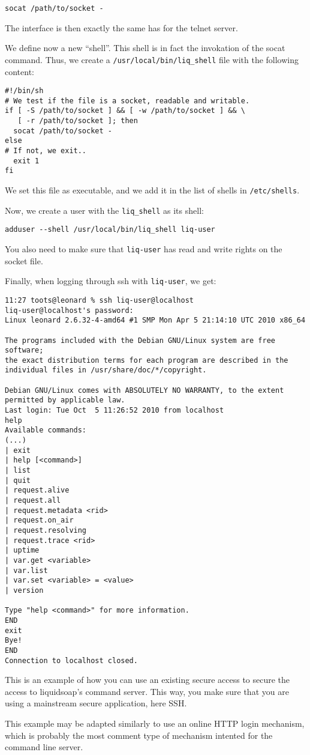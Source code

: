 \begin{verbatim}
socat /path/to/socket -
\end{verbatim}
The interface is then exactly the same has for the telnet server.

We define now a new ``shell''. This shell is in fact the invokation of the 
socat command. Thus, we create a \verb+/usr/local/bin/liq_shell+ file with the following
content:

\begin{verbatim}
#!/bin/sh
# We test if the file is a socket, readable and writable.
if [ -S /path/to/socket ] && [ -w /path/to/socket ] && \
   [ -r /path/to/socket ]; then
  socat /path/to/socket -
else
# If not, we exit..
  exit 1
fi
\end{verbatim}
We set this file as executable, and we add it in the list of shells in \verb+/etc/shells+.

Now, we create a user with the \verb+liq_shell+ as its shell:

\begin{verbatim}
adduser --shell /usr/local/bin/liq_shell liq-user
\end{verbatim}
You also need to make sure that \verb+liq-user+ has read and write rights
on the socket file.

Finally, when logging through ssh with \verb+liq-user+, we get:

\begin{verbatim}
11:27 toots@leonard % ssh liq-user@localhost
liq-user@localhost's password: 
Linux leonard 2.6.32-4-amd64 #1 SMP Mon Apr 5 21:14:10 UTC 2010 x86_64

The programs included with the Debian GNU/Linux system are free software;
the exact distribution terms for each program are described in the
individual files in /usr/share/doc/*/copyright.

Debian GNU/Linux comes with ABSOLUTELY NO WARRANTY, to the extent
permitted by applicable law.
Last login: Tue Oct  5 11:26:52 2010 from localhost
help
Available commands:
(...)
| exit
| help [<command>]
| list
| quit
| request.alive
| request.all
| request.metadata <rid>
| request.on_air
| request.resolving
| request.trace <rid>
| uptime
| var.get <variable>
| var.list
| var.set <variable> = <value>
| version

Type "help <command>" for more information.
END
exit
Bye!
END
Connection to localhost closed.
\end{verbatim}
This is an example of how you can use an existing secure access to 
secure the access to liquidsoap's command server. This way, you make sure
that you are using a mainstream secure application, here SSH.

This example may be adapted similarly to use an online HTTP login 
mechanism, which is probably the most comment type of mechanism
intented for the command line server.


